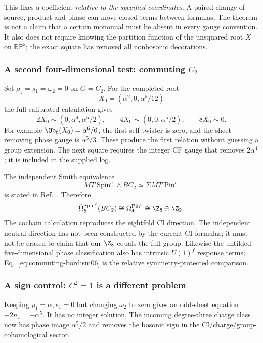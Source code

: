 This fixes a coefficient \emph{relative to the specified coordinates}. A paired change of source, product and phase can move closed terms between formulas. The theorem is not a claim that a certain monomial must be absent in every gauge convention. It also does not require knowing the partition function of the unsquared root $X$ on $\mathbb{RP}^5$; the exact square has removed all nonbosonic decorations.


\subsubsection{A second four-dimensional test: commuting \texorpdfstring{$C_2$}{C2}}
Set ${\rho_1}={s_1}=\omega_2=0$ on $G=C_2$. For the completed root
\begin{equation}
       X_0=(\alpha^2,0,\alpha^5/12)
\end{equation}
the full calibrated calculation gives
\begin{equation}\label{eq:commuting-powers06}
 \boxed{2X_0\sim(0,\alpha^4,\alpha^5/2),\qquad
        4X_0\sim(0,0,\alpha^5/2),\qquad8X_0\sim0.}
\end{equation}
For example $\Ob_6(X_0)=\alpha^6/6$, the first self-twister is zero, and the sheet-removing phase gauge is $\alpha^5/3$. These produce the first relation without guessing a group extension. The next square requires the integer CF gauge that removes $2\alpha^4$; it is included in the supplied log.

The independent Smith equivalence
\begin{equation}
 MT\operatorname{Spin}^c\wedge BC_2\simeq\Sigma MT\operatorname{Pin}^c
\end{equation}
is stated in Ref.~\cite[Example~7.11]{SmithFiber}. Therefore
\begin{equation}\label{eq:commuting-bordism06}
 \widetilde\Omega_5^{\operatorname{Spin}^c}(BC_2)
        \cong\Omega_4^{\operatorname{Pin}^c}
        \cong\Z_8\oplus\Z_2.
\end{equation}
The cochain calculation reproduces the eightfold CI direction. The independent neutral direction has not been constructed by the current CI formulas; it must not be erased to claim that our $\Z_8$ equals the full group. Likewise the untilded five-dimensional phase classification also has intrinsic $U(1)^f$ response terms; Eq.~\eqref{eq:commuting-bordism06} is the relative symmetry-protected comparison.


\subsubsection{A sign control: \texorpdfstring{$C^2=1$}{C squared equals one} is a different problem}
Keeping ${\rho_1}=\alpha,{s_1}=0$ but changing $\omega_2$ to zero gives an odd-sheet equation $-2n_4=-\alpha^5$. It has no integer solution. The incoming degree-three charge class now has phase image $\alpha^5/2$ and removes the bosonic sign in the CI/charge/group-cohomological sector.

